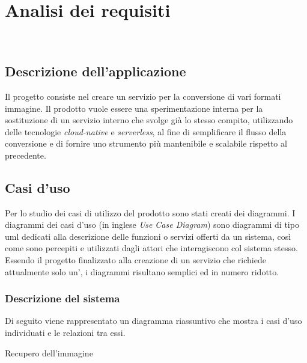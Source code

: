 
\chapter{Analisi dei requisiti}
\label{cap:analisi-requisiti}

\\

\section{Descrizione dell'applicazione}
Il progetto consiste nel creare un servizio per la
conversione di vari formati immagine. Il prodotto vuole essere una
sperimentazione interna per la sostituzione di un servizio interno che svolge
già lo stesso compito, utilizzando delle tecnologie \emph{cloud-native} e
\emph{serverless}, al fine di semplificare il flusso della conversione e di
fornire uno strumento più mantenibile e scalabile rispetto al precedente.\\


\section{Casi d'uso}

Per lo studio dei casi di utilizzo del prodotto sono stati creati dei diagrammi.
I diagrammi dei casi d'uso (in inglese \emph{Use Case Diagram}) sono diagrammi di tipo \gls{uml} dedicati
alla descrizione delle funzioni o servizi offerti da un sistema, così come sono
percepiti e utilizzati dagli attori che interagiscono col sistema stesso.
Essendo il progetto finalizzato alla creazione di un servizio che richiede
attualmente solo un', i diagrammi risultano semplici ed in numero ridotto.

\subsection{Descrizione del sistema}
Di seguito viene rappresentato un diagramma riassuntivo che mostra i casi d'uso
individuati e le relazioni tra essi.

\begin{usecase}{1}{Recupero dell'immagine}
    \label{uc:recupero-immagine}
\end{usecase}

